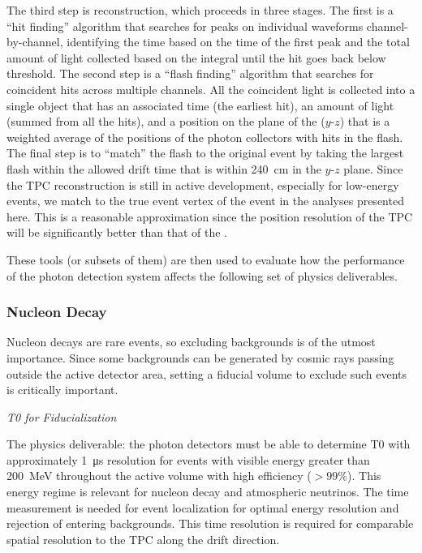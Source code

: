 The third step is reconstruction, which proceeds in three stages. The first is a ``hit finding'' algorithm that searches for peaks on individual waveforms channel-by-channel, identifying the time based on the time of the first peak and the total amount of light collected based on the integral until the hit goes back below threshold. The second step is a ``flash finding'' algorithm that searches for coincident hits across multiple channels. All the coincident light is collected into a single object that has an associated time (the earliest hit), an amount of light (summed from all the hits), and a position on the plane of the  ($y$-$z$) that is a weighted average of the positions of the photon collectors with hits in the flash. %
The final step is to ``match'' the flash to the original event by taking the largest flash within the allowed drift time that is within \SI{240}{cm} in the $y$-$z$ plane. Since the TPC reconstruction is still in active development, especially for low-energy events, we match to the true event %
vertex of the event in the analyses presented here. This is a reasonable approximation since the position resolution of the TPC will be significantly better than that of the . 

These tools (or subsets of them) are then used to evaluate how the performance of the photon detection system affects the following set of physics deliverables.

\subsubsection{Nucleon Decay}

Nucleon decays are rare events, so excluding backgrounds is of the utmost importance. Since some backgrounds can be generated by cosmic rays passing outside the active detector area, setting a fiducial volume to exclude such events is critically important.

\textit{\it T0 for Fiducialization}

The physics deliverable: the photon detectors must be able to determine T0 with approximately \SI{1}{\micro s} resolution for events with visible energy greater than \SI{200}{MeV} throughout the active volume with high efficiency ($>99\%$). This energy regime is relevant for nucleon decay and atmospheric neutrinos. The time measurement is needed for event localization for optimal energy resolution and rejection of entering backgrounds. 
This time resolution is required for comparable spatial resolution to the TPC along the drift direction.

